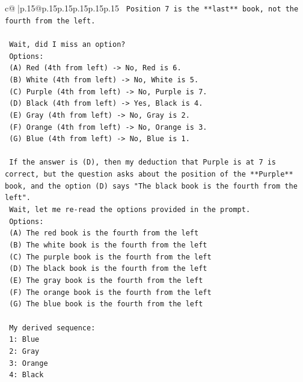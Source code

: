 \documentclass{article}
\begin{document}
{\begin{supertabular}{c@{$\;$}|p{.15\linewidth}@{}p{.15\linewidth}p{.15\linewidth}p{.15\linewidth}p{.15\linewidth}p{.15\linewidth}}
{{{\texttt{    Position 7 is the **last** book, not the fourth from the left.} \\
\\ 
\texttt{    Wait, did I miss an option?} \\
\texttt{    Options:} \\
\texttt{    (A) Red (4th from left) {-}> No, Red is 6.} \\
\texttt{    (B) White (4th from left) {-}> No, White is 5.} \\
\texttt{    (C) Purple (4th from left) {-}> No, Purple is 7.} \\
\texttt{    (D) Black (4th from left) {-}> Yes, Black is 4.} \\
\texttt{    (E) Gray (4th from left) {-}> No, Gray is 2.} \\
\texttt{    (F) Orange (4th from left) {-}> No, Orange is 3.} \\
\texttt{    (G) Blue (4th from left) {-}> No, Blue is 1.} \\
\\ 
\texttt{    If the answer is (D), then my deduction that Purple is at 7 is correct, but the question asks about the position of the **Purple** book, and the option (D) says "The black book is the fourth from the left".} \\
\texttt{    Wait, let me re{-}read the options provided in the prompt.} \\
\texttt{    Options:} \\
\texttt{    (A) The red book is the fourth from the left} \\
\texttt{    (B) The white book is the fourth from the left} \\
\texttt{    (C) The purple book is the fourth from the left} \\
\texttt{    (D) The black book is the fourth from the left} \\
\texttt{    (E) The gray book is the fourth from the left} \\
\texttt{    (F) The orange book is the fourth from the left} \\
\texttt{    (G) The blue book is the fourth from the left} \\
\\ 
\texttt{    My derived sequence:} \\
\texttt{    1: Blue} \\
\texttt{    2: Gray} \\
\texttt{    3: Orange} \\
\texttt{    4: Black} \\
}}}
\end{supertabular}}
\end{document}
